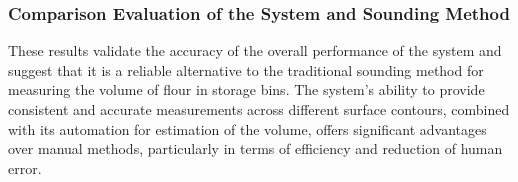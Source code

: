 



\subsubsection{Comparison Evaluation of the System and Sounding Method}

These results validate the accuracy of the overall performance of the system and suggest that it is a reliable alternative to the traditional sounding method for measuring the volume of flour in storage bins. The system's ability to provide consistent and accurate measurements across different surface contours, combined with its automation for estimation of the volume, offers significant advantages over manual methods, particularly in terms of efficiency and reduction of human error.



